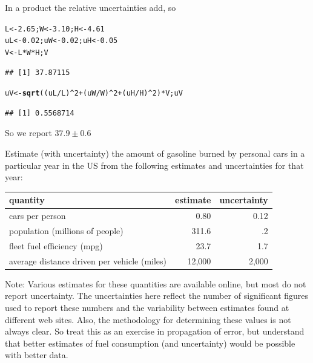 \documentclass[twoside]{book}\usepackage[]{graphicx}\usepackage[]{xcolor}
\makeatletter
\newcommand{\hlnum}[1]{\textcolor[rgb]{0.686,0.059,0.569}{#1}}%
\newcommand{\hlopt}[1]{\textcolor[rgb]{0,0,0}{#1}}%
\newcommand{\hlstd}[1]{\textcolor[rgb]{0.345,0.345,0.345}{#1}}%
\newcommand{\hlkwb}[1]{\textcolor[rgb]{0.69,0.353,0.396}{#1}}%
\newcommand{\hlkwd}[1]{\textcolor[rgb]{0.737,0.353,0.396}{\textbf{#1}}}%
\newenvironment{kframe}{%
 \def\at@end@of@kframe{}%
 \ifinner\ifhmode%
  \def\at@end@of@kframe{\end{minipage}}%
  \begin{minipage}{\columnwidth}%
 \fi\fi%
 \def\FrameCommand##1{\hskip\@totalleftmargin \hskip-\fboxsep
 \colorbox{shadecolor}{##1}\hskip-\fboxsep
     \hskip-\linewidth \hskip-\@totalleftmargin \hskip\columnwidth}%
 \MakeFramed {\advance\hsize-\width
   \@totalleftmargin\z@ \linewidth\hsize
   \@setminipage}}%
 {\par\unskip\endMakeFramed%
 \at@end@of@kframe}
\newenvironment{knitrout}{}{} %
\makeatother
\begin{document}
\begin{solution}
	In a product the relative uncertainties add, so
\begin{knitrout}
\color{fgcolor}\begin{kframe}
\begin{alltt}
\hlstd{L} \hlkwb{<-} \hlnum{2.65}\hlstd{; W} \hlkwb{<-} \hlnum{3.10}\hlstd{; H} \hlkwb{<-} \hlnum{4.61}
\hlstd{uL} \hlkwb{<-} \hlnum{0.02}\hlstd{; uW} \hlkwb{<-} \hlnum{0.02}\hlstd{; uH} \hlkwb{<-} \hlnum{0.05}
\hlstd{V} \hlkwb{<-} \hlstd{L} \hlopt{*} \hlstd{W} \hlopt{*} \hlstd{H; V}
\end{alltt}
\begin{verbatim}
## [1] 37.87115
\end{verbatim}
\begin{alltt}
\hlstd{uV} \hlkwb{<-} \hlkwd{sqrt}\hlstd{( (uL}\hlopt{/}\hlstd{L)}\hlopt{^}\hlnum{2} \hlopt{+} \hlstd{(uW}\hlopt{/}\hlstd{W)}\hlopt{^}\hlnum{2} \hlopt{+} \hlstd{(uH}\hlopt{/}\hlstd{H)}\hlopt{^}\hlnum{2}\hlstd{)} \hlopt{*} \hlstd{V; uV}
\end{alltt}
\begin{verbatim}
## [1] 0.5568714
\end{verbatim}
\end{kframe}
\end{knitrout}
	So we report $37.9 \pm 0.6$

\end{solution}

\begin{problem}
	Estimate (with uncertainty) 
	the amount of gasoline burned by personal cars in a particular
	year in the US from the following estimates and uncertainties for that
	year:

	\begin{center}
		\begin{tabular}{lrr}
			\hline
			quantity & estimate & uncertainty
			\\
			\hline
			cars per person & 0.80 & 0.12
			\\
			population (millions of people) & 311.6 & .2 
			\\
			fleet fuel efficiency (mpg) & 23.7 & 1.7 
			\\
			average distance driven per vehicle (miles) & 12,000 & 2,000 
			\\
			\hline
		\end{tabular}
	\end{center}

	Note:  Various estimates for these quantities are available online, but 
	most do not report uncertainty.  The uncertainties here reflect the 
	number of significant figures used to report these numbers and the 
	variability between estimates found at different web sites.
	Also, the methodology for determining these values is not always
	clear.  So treat this as an exercise in propagation of error, but 
	understand that better estimates of fuel consumption (and uncertainty)
	would be possible with better data.
\end{problem}
\end{document}

